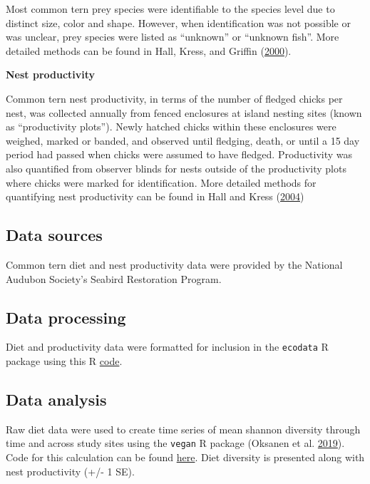 \documentclass[
]{book}
\begin{document}
Most common tern prey species were identifiable to the species level due to distinct size, color and shape. However, when identification was not possible or was unclear, prey species were listed as ``unknown'' or ``unknown fish''. More detailed methods can be found in Hall, Kress, and Griffin (\protect\hyperlink{ref-hall2000}{2000}).

\textbf{Nest productivity}

Common tern nest productivity, in terms of the number of fledged chicks per nest, was collected annually from fenced enclosures at island nesting sites (known as ``productivity plots''). Newly hatched chicks within these enclosures were weighed, marked or banded, and observed until fledging, death, or until a 15 day period had passed when chicks were assumed to have fledged. Productivity was also quantified from observer blinds for nests outside of the productivity plots where chicks were marked for identification. More detailed methods for quantifying nest productivity can be found in Hall and Kress (\protect\hyperlink{ref-hall2004}{2004})

\hypertarget{data-sources-33}{%
\subsection{Data sources}\label{data-sources-33}}

Common tern diet and nest productivity data were provided by the National Audubon Society's Seabird Restoration Program.

\hypertarget{data-processing-23}{%
\subsection{Data processing}\label{data-processing-23}}

Diet and productivity data were formatted for inclusion in the \texttt{ecodata} R package using this R \href{https://github.com/NOAA-EDAB/ecodata/blob/master/data-raw/get_seabird_ne.R}{code}.

\hypertarget{data-analysis-31}{%
\subsection{Data analysis}\label{data-analysis-31}}

Raw diet data were used to create time series of mean shannon diversity through time and across study sites using the \texttt{vegan} R package (Oksanen et al. \protect\hyperlink{ref-R-vegan}{2019}). Code for this calculation can be found \href{https://github.com/NOAA-EDAB/tech-doc/blob/master/R/stored_scripts/seabird_ne_div_analysis.R}{here}. Diet diversity is presented along with nest productivity (+/- 1 SE).
\end{document}
